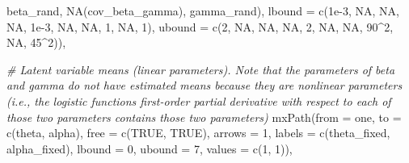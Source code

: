 \documentclass[
12pt, %
twoside,
english]{guelphthesis}
\newenvironment{Shaded}{\begin{snugshade}}{\end{snugshade}}
\newcommand{\AttributeTok}[1]{\textcolor[rgb]{0.77,0.63,0.00}{#1}}
\newcommand{\CommentTok}[1]{\textcolor[rgb]{0.56,0.35,0.01}{\textit{#1}}}
\newcommand{\ConstantTok}[1]{\textcolor[rgb]{0.00,0.00,0.00}{#1}}
\newcommand{\DecValTok}[1]{\textcolor[rgb]{0.00,0.00,0.81}{#1}}
\newcommand{\FloatTok}[1]{\textcolor[rgb]{0.00,0.00,0.81}{#1}}
\newcommand{\FunctionTok}[1]{\textcolor[rgb]{0.00,0.00,0.00}{#1}}
\newcommand{\NormalTok}[1]{#1}
\newcommand{\SpecialCharTok}[1]{\textcolor[rgb]{0.00,0.00,0.00}{#1}}
\newcommand{\StringTok}[1]{\textcolor[rgb]{0.31,0.60,0.02}{#1}}
\begin{document}
\begin{Shaded}
\begin{Highlighting}[numbers=left,,]
                  \StringTok{\textquotesingle{}beta\_rand\textquotesingle{}}\NormalTok{, }\StringTok{\textquotesingle{}NA(cov\_beta\_gamma)\textquotesingle{}}\NormalTok{, }
                  \StringTok{\textquotesingle{}gamma\_rand\textquotesingle{}}\NormalTok{), }
         \AttributeTok{lbound =} \FunctionTok{c}\NormalTok{(}\FloatTok{1e{-}3}\NormalTok{, }\ConstantTok{NA}\NormalTok{, }\ConstantTok{NA}\NormalTok{, }\ConstantTok{NA}\NormalTok{, }
                    \FloatTok{1e{-}3}\NormalTok{, }\ConstantTok{NA}\NormalTok{, }\ConstantTok{NA}\NormalTok{, }
                    \DecValTok{1}\NormalTok{, }\ConstantTok{NA}\NormalTok{,}
                    \DecValTok{1}\NormalTok{), }
         \AttributeTok{ubound =} \FunctionTok{c}\NormalTok{(}\DecValTok{2}\NormalTok{, }\ConstantTok{NA}\NormalTok{, }\ConstantTok{NA}\NormalTok{, }\ConstantTok{NA}\NormalTok{, }
                    \DecValTok{2}\NormalTok{, }\ConstantTok{NA}\NormalTok{, }\ConstantTok{NA}\NormalTok{, }
                    \DecValTok{90}\SpecialCharTok{\^{}}\DecValTok{2}\NormalTok{, }\ConstantTok{NA}\NormalTok{, }
                    \DecValTok{45}\SpecialCharTok{\^{}}\DecValTok{2}\NormalTok{)),}
  
  \CommentTok{\# Latent variable means (linear parameters). Note that the parameters of beta and gamma do not have estimated means because they are nonlinear parameters (i.e., the logistic function\textquotesingle{}s first{-}order partial derivative with respect to each of those two parameters contains those two parameters)}
  \FunctionTok{mxPath}\NormalTok{(}\AttributeTok{from =} \StringTok{\textquotesingle{}one\textquotesingle{}}\NormalTok{, }\AttributeTok{to =} \FunctionTok{c}\NormalTok{(}\StringTok{\textquotesingle{}theta\textquotesingle{}}\NormalTok{, }\StringTok{\textquotesingle{}alpha\textquotesingle{}}\NormalTok{), }\AttributeTok{free =} \FunctionTok{c}\NormalTok{(}\ConstantTok{TRUE}\NormalTok{, }\ConstantTok{TRUE}\NormalTok{), }\AttributeTok{arrows =} \DecValTok{1}\NormalTok{,}
         \AttributeTok{labels =} \FunctionTok{c}\NormalTok{(}\StringTok{\textquotesingle{}theta\_fixed\textquotesingle{}}\NormalTok{, }\StringTok{\textquotesingle{}alpha\_fixed\textquotesingle{}}\NormalTok{), }\AttributeTok{lbound =} \DecValTok{0}\NormalTok{, }\AttributeTok{ubound =} \DecValTok{7}\NormalTok{, }
         \AttributeTok{values =} \FunctionTok{c}\NormalTok{(}\DecValTok{1}\NormalTok{, }\DecValTok{1}\NormalTok{)),}
  

\end{Highlighting}
\end{Shaded}
\end{document}
